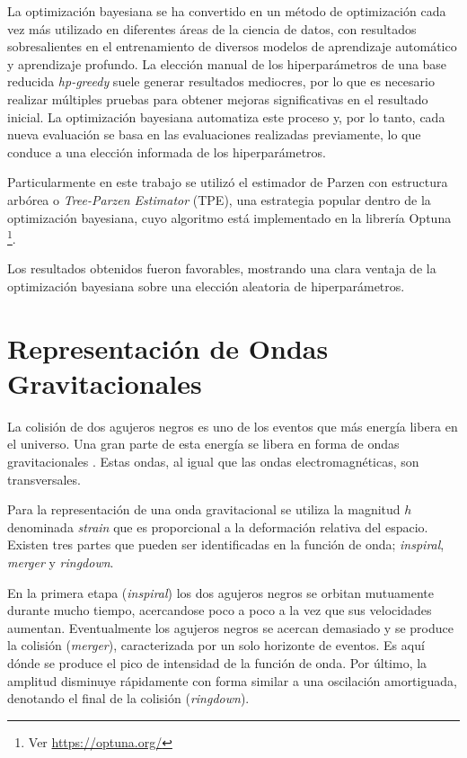 La optimización bayesiana \cite{7352306, https://doi.org/10.48550/arxiv.1012.2599} se ha convertido en un método de optimización cada vez más utilizado en diferentes áreas de la ciencia de datos, con resultados sobresalientes en el entrenamiento de diversos modelos de aprendizaje automático y aprendizaje profundo. La elección manual de los hiperparámetros de una base reducida \textit{hp-greedy} suele generar resultados mediocres, por lo que es necesario realizar múltiples pruebas para obtener mejoras significativas en el resultado inicial. La optimización bayesiana automatiza este proceso y, por lo tanto, cada nueva evaluación se basa en las evaluaciones realizadas previamente, lo que conduce a una elección informada de los hiperparámetros. 

Particularmente en este trabajo se utilizó el estimador de Parzen con estructura arbórea o \textit{Tree-Parzen Estimator} (TPE), una estrategia popular dentro de la optimización bayesiana, cuyo algoritmo está implementado en la librería Optuna \cite{optuna_2019} \footnote{Ver \url{https://optuna.org/}}. 


Los resultados obtenidos fueron favorables, mostrando una clara ventaja de la optimización bayesiana sobre una elección aleatoria de hiperparámetros.











\section{Representación de Ondas Gravitacionales}

La colisión de dos agujeros negros es uno de los eventos que más energía libera en el universo. Una gran parte de esta energía se libera en forma de ondas gravitacionales \cite{Centrella_2010}. Estas ondas, al igual que las ondas electromagnéticas, son transversales.

Para la representación de una onda gravitacional se utiliza la magnitud $h$ denominada \textit{strain} que es proporcional a la deformación relativa del espacio. Existen tres partes que pueden ser identificadas en la función de onda; \textit{inspiral}, \textit{merger} y \textit{ringdown}. 

En la primera etapa (\textit{inspiral}) los dos agujeros negros se orbitan mutuamente durante mucho tiempo, acercandose poco a poco a la vez que sus velocidades aumentan. Eventualmente los agujeros negros se acercan demasiado y se produce la colisión (\textit{merger}), caracterizada por un solo horizonte de eventos. Es aquí dónde se produce el pico de intensidad de la función de onda. Por último, la amplitud disminuye rápidamente con forma similar a una oscilación amortiguada, denotando el final de la colisión (\textit{ringdown}).

